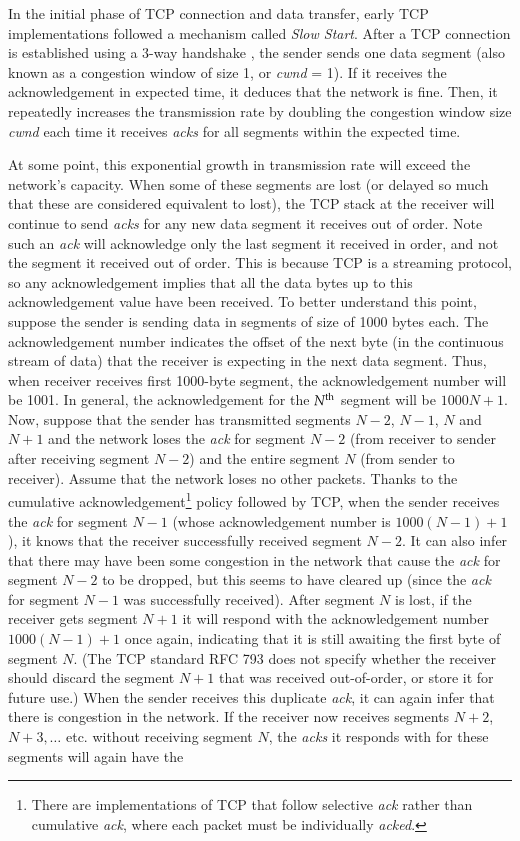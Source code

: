 \begin{multicols}{2}
In the initial phase of TCP connection and data transfer, early TCP implementations followed a mechanism called \textit{Slow Start}. After a TCP connection is established using a 3-way handshake  \cite{art2-key02}, the sender sends one data segment (also known as a congestion window of size 1, or \textit{cwnd} = 1). If it receives the acknowledgement in expected time, it deduces that the network is fine. Then, it repeatedly increases the transmission rate by doubling the congestion window size \textit{cwnd} each time it receives \textit{acks} for all segments within the expected time.

At some point, this exponential growth in transmission rate will exceed the network’s capacity. When some of these segments are lost (or delayed so much that these are considered equivalent to lost), the TCP stack at the receiver will continue to send \textit{acks} for any new data segment it receives out of order. Note such an \textit{ack} will acknowledge only the last segment it received in order, and not the segment it received out of order. This is because TCP is a streaming protocol, so any acknowledgement implies that all the data bytes up to this acknowledgement value have been received. To better understand this point, suppose the sender is sending data in segments of size of 1000 bytes each. The acknowledgement number indicates the offset of the next byte (in the continuous stream of data) that the receiver is expecting in the next data segment. Thus, when receiver receives first 1000-byte segment, the acknowledgement number will be 1001. In general, the acknowledgement for the $N^{\rm th}$ segment will be $1000N + 1$. Now, suppose that the sender has transmitted segments $N-2$, $N-1$, $N$ and $N+1$ and the network loses the \textit{ack} for segment $N-2$ (from receiver to sender after receiving segment $N-2$) and the entire segment $N$ (from sender to receiver). Assume that the network loses no other packets. Thanks to the cumulative acknowledgement\footnote{There are implementations of TCP that follow selective \textit{ack} rather than cumulative \textit{ack}, where each packet must  be individually \textit{acked}.} policy followed by TCP, when the sender receives the \textit{ack} for segment $N-1$ (whose acknowledgement number is $1000(N-1) + 1$), it knows that the receiver successfully received segment $N-2$. It can also infer that there may have been some congestion in the network that cause the \textit{ack} for segment $N-2$ to be dropped, but this seems to have cleared up (since the \textit{ack} for segment $N-1$ was successfully received). After segment $N$ is lost, if the receiver gets segment $N+1$ it will respond with the acknowledgement number $1000(N-1) + 1$ once again, indicating that it is still awaiting the first byte of segment $N$. (The TCP standard RFC 793 \cite{art2-key02} does not specify whether the receiver should discard the segment $N+1$ that was received out-of-order, or store it for future use.) When the sender receives this duplicate \textit{ack}, it can again infer that there is congestion in the network. If the receiver now receives segments $N+2$, $N+3, … $ etc. without receiving segment $N$, the \textit{acks} it responds with for these segments will again have the 
\end{multicols}
